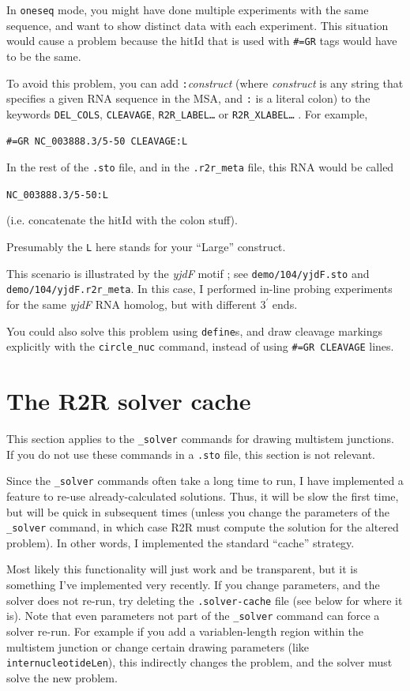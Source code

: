 \documentclass[letterpaper,12pt]{report}
\begin{document}
In {\tt oneseq} mode, you might have done multiple experiments with the same sequence, and want to show distinct data with each experiment.
This situation would cause a problem because the hitId that is used with {\tt \#=GR} tags would have to be the same.  

To avoid this problem,
you can add {\tt :}\textit{construct}
(where \textit{construct} is any string that specifies a given
RNA sequence in the MSA, and {\tt :} is a literal colon)
to the keywords {\tt DEL\_COLS}, {\tt CLEAVAGE}, {\tt R2R\_LABEL{\dots}} or
{\tt R2R\_XLABEL{\dots}} .  For example,

{\tt \#=GR NC\_003888.3/5-50 CLEAVAGE:L}

In the rest of the {\tt .sto} file, and in the {\tt .r2r\_meta} file, this RNA would
be called

{\tt NC\_003888.3/5-50:L}

(i.e. concatenate the hitId with the colon stuff).

Presumably the {\tt L} here stands for your
``Large'' construct.

This scenario is illustrated by the {\it yjdF} motif \cite{Weinberg104Motifs}; see {\tt demo/104/yjdF.sto} and {\tt demo/104/yjdF.r2r\_meta}.  In this case, I performed in-line probing experiments for the same {\it yjdF} RNA homolog, but with different $3^\prime$ ends.

You could also solve this problem using {\tt define}s, and draw cleavage markings explicitly
with the {\tt circle\_nuc} command, instead of using {\tt \#=GR CLEAVAGE} lines.

\section{The R2R solver cache}

This section applies to the {\tt \_solver} commands for drawing multistem junctions.  If you do not use these commands in a {\tt .sto} file, this section is not relevant.

Since the {\tt \_solver} commands often take a long time to run, I have implemented a feature to re-use already-calculated solutions.  Thus, it will be slow the first time, but will be quick in subsequent times (unless you change the parameters of the {\tt \_solver} command, in which case R2R must compute the solution for the altered problem).  In other words, I implemented the standard ``cache'' strategy.

Most likely this functionality will just work and be transparent, but it is something I've implemented very recently.
If you change parameters, and the solver does not re-run, try deleting the {\tt .solver-cache} file (see below for where it is).
Note that even parameters not part of the {\tt \_solver} command can force a solver re-run.  For example if you add a variablen-length region within the multistem junction or change certain drawing parameters (like {\tt internucleotideLen}), this indirectly changes the problem, and the solver must solve the new problem.
\end{document}

